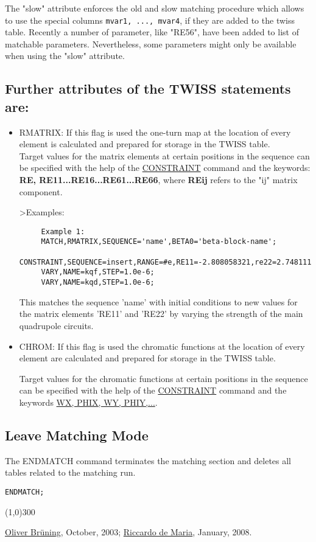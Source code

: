  The "slow" attribute enforces the old and slow matching procedure which allows
 to use the special columns \texttt{mvar1, ..., mvar4}, if they are added to the twiss table.
 Recently a number of parameter, like "RE56", have been 
 added to list of matchable parameters. Nevertheless, some parameters
 might only be available when using the "slow" attribute.
 

\subsection{\href{match}{}{ Further attributes of the TWISS statements
 are:}}
\begin{itemize}
	\item 
 RMATRIX: If this flag is used the one-turn map at the location of every
 element is calculated and prepared for storage in the TWISS table.
\\Target values for the matrix elements at certain positions in the sequence
 can be specified with the help of the \href{match_con.html#constraint}{CONSTRAINT}
 command and the
 keywords: \textbf{RE, RE11...RE16...RE61...RE66}, where \textbf{REij} refers
 to the "ij" matrix component.
 
 
\textgreater Examples:
 
\begin{verbatim}
     Example 1:
     MATCH,RMATRIX,SEQUENCE='name',BETA0='beta-block-name';
     CONSTRAINT,SEQUENCE=insert,RANGE=#e,RE11=-2.808058321,re22=2.748111197;
     VARY,NAME=kqf,STEP=1.0e-6;
     VARY,NAME=kqd,STEP=1.0e-6;
\end{verbatim}
 This matches the sequence 'name' with initial conditions to new values
 for the matrix elements 'RE11' and 'RE22' by varying the strength of the
 main quadrupole circuits.
\end{itemize}
\begin{itemize}
	\item 
 CHROM: If this flag is used the chromatic functions at the location of every
 element are calculated and prepared for storage in the TWISS table.

 Target values for the chromatic functions at certain positions in the
 sequence can be specified with the help of the \href{match_con.html#constraint}{CONSTRAINT} command and the keywords \href{../Introduction/tables.html#normal}{WX, PHIX, WY, PHIY,...}.
 
 
\end{itemize}

\subsection{\href{endmatch}{}Leave Matching Mode}
 The ENDMATCH command terminates the matching section and deletes all tables
 related to the matching run.
 
\begin{verbatim}
ENDMATCH;\end{verbatim}

\line(1,0){300}

\href{http://bruening.home.cern.ch/bruening/}{Oliver Br\"uning},
 October, 2003;
 \href{http://rdemaria.home.cern.ch/rdemaria/}{Riccardo de Maria}, January, 2008.
 

